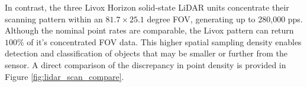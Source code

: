 \documentclass{erauthesis}
\begin{document}

In contrast, the three Livox Horizon solid-state \ac{LiDAR} units concentrate their scanning pattern within an $81.7 \times 25.1$ degree \ac{FOV}, generating up to 280,000 \ac{pps}. 
Although the nominal point rates are comparable, the Livox pattern can return $100 \%$ of it's concentrated \ac{FOV} data. 
This higher spatial sampling density enables detection and classification of objects that may be smaller or further from the sensor.
A direct comparison of the discrepancy in point density is provided in Figure \ref{fig:lidar_scan_compare}.

\end{document}
